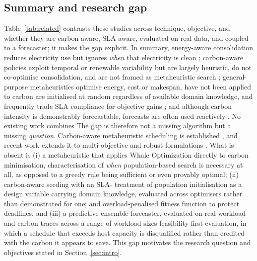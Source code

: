 \documentclass[12pt,a4paper]{article}
\providecommand{\DIFaddtex}[1]{{\protect\color{blue} \sf #1}} %
\providecommand{\DIFdeltex}[1]{{\protect\color{red} \scriptsize #1}} %
\providecommand{\DIFaddbegin}{} %
\providecommand{\DIFaddend}{} %
\providecommand{\DIFdelbegin}{} %
\providecommand{\DIFdelend}{} %
\providecommand{\DIFadd}[1]{\texorpdfstring{\DIFaddtex{#1}}{#1}} %
\providecommand{\DIFdel}[1]{\texorpdfstring{\DIFdeltex{#1}}{}} %
\providecommand{\DIFscaledelfig}{0.5}
\newlength{\DIFdelgraphicswidth} %
\newlength{\DIFdelgraphicsheight} %
\providecommand{\DIFaddincludegraphics}[2][]{{\color{blue}\fbox{\DIFOincludegraphics[#1]{#2}}}} %
\providecommand{\DIFdelincludegraphics}[2][]{%
\sbox{\DIFdelgraphicsbox}{\DIFOincludegraphics[#1]{#2}}%
\settoboxwidth{\DIFdelgraphicswidth}{\DIFdelgraphicsbox} %
\settoboxtotalheight{\DIFdelgraphicsheight}{\DIFdelgraphicsbox} %
\scalebox{\DIFscaledelfig}{%
\parbox[b]{\DIFdelgraphicswidth}{\usebox{\DIFdelgraphicsbox}\\[-\baselineskip] \rule{\DIFdelgraphicswidth}{0em}}\llap{\resizebox{\DIFdelgraphicswidth}{\DIFdelgraphicsheight}{%
\setlength{\unitlength}{\DIFdelgraphicswidth}%
\begin{picture}(1,1)%
\thicklines\linethickness{2pt} %
{\color[rgb]{1,0,0}\put(0,0){\framebox(1,1){}}}%
{\color[rgb]{1,0,0}\put(0,0){\line( 1,1){1}}}%
{\color[rgb]{1,0,0}\put(0,1){\line(1,-1){1}}}%
\end{picture}%
}\hspace*{3pt}}} %
} %
\DeclareRobustCommand{\DIFaddbegin}{\DIFOaddbegin \let\includegraphics\DIFaddincludegraphics} %
\DeclareRobustCommand{\DIFaddend}{\DIFOaddend \let\includegraphics\DIFOincludegraphics} %
\DeclareRobustCommand{\DIFdelbegin}{\DIFOdelbegin \let\includegraphics\DIFdelincludegraphics} %
\DeclareRobustCommand{\DIFdelend}{\DIFOaddend \let\includegraphics\DIFOincludegraphics} %
\begin{document}
\subsection{Summary and research gap}
Table~\ref{tab:related} contrasts these studies across technique, objective, and whether they are
carbon-aware, SLA-aware, evaluated on real data, and coupled to a forecaster; it makes the gap explicit. In
summary, energy-aware consolidation reduces electricity use but ignores \emph{when} that electricity is
clean \cite{beloglazov2012optimal, beloglazov2012energy}; carbon-aware policies exploit temporal or renewable
variability but are largely heuristic, do not co-optimise consolidation, and are not framed as metaheuristic
search \cite{goiri2011greenslot, wiesner2021lets, radovanovic2023carbon}; general-purpose metaheuristics
optimise energy, cost or makespan, \DIFdelbegin \DIFdel{have not been applied to carbon}\DIFdelend \DIFaddbegin \DIFadd{are initialised at random regardless of available domain knowledge}\DIFaddend , and
frequently trade SLA compliance for objective gains \cite{kalra2015review, mirjalili2016whale,
heidari2019harris}; and although carbon intensity is demonstrably forecastable, forecasts are often used
reactively \cite{leerbeck2020short, maji2022carboncast}.
\DIFdelbegin \DIFdel{No existing work combines }\DIFdelend \DIFaddbegin \DIFadd{The gap is therefore not a missing algorithm but a missing \emph{question}. Carbon-aware metaheuristic
scheduling is established \cite{abbasikhazaei2022energy, khodayarseresht2023energy, miao2024energy}, and
recent work extends it to multi-objective and robust formulations \cite{danach2026carbon, ruparel2026carbon}.
What is absent is }\DIFaddend (i) a \DIFdelbegin \DIFdel{metaheuristic that applies Whale Optimization directly to carbon minimisation, }\DIFdelend \DIFaddbegin \DIFadd{characterisation of \emph{when} population-based search is necessary at all, as
opposed to a greedy rule being sufficient or even provably optimal; }\DIFaddend (ii) \DIFdelbegin \DIFdel{carbon-aware seeding with an SLA- }\DIFdelend \DIFaddbegin \DIFadd{treatment of population
initialisation as a design variable carrying domain knowledge, evaluated across optimisers rather than
demonstrated for one; }\DIFaddend and \DIFdelbegin \DIFdel{overload-penalised fitness function to protect deadlines, and }\DIFdelend (iii) \DIFdelbegin \DIFdel{a predictive ensemble forecaster, evaluated on real workload and carbon traces across a range of workload
sizes}\DIFdelend \DIFaddbegin \DIFadd{feasibility-first evaluation, in which a schedule that exceeds host capacity is
disqualified rather than credited with the carbon it appears to save}\DIFaddend . This gap motivates the research question
and objectives stated in Section~\ref{sec:intro}.
\end{document}
